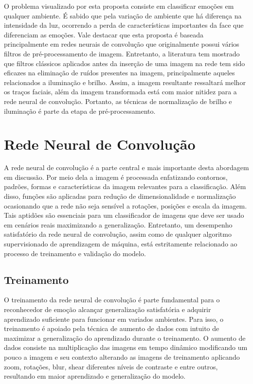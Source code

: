 O problema visualizado por esta proposta consiste em classificar emoções em qualquer ambiente. É sabido que pela variação de ambiente que há diferença na intensidade da luz, ocorrendo a perda de características importantes da face que diferenciam as emoções. Vale destacar que esta proposta é baseada principalmente em redes neurais de convolução que originalmente possui vários filtros de pré-processamento de imagem. Entretanto, a literatura tem mostrado que filtros clássicos aplicados antes da inserção de uma imagem na rede tem sido eficazes na eliminação de ruídos presentes na imagem, principalmente aqueles relacionados a iluminação e brilho. Assim, a imagem resultante ressaltará melhor os traços faciais, além da imagem transformada está com maior nitidez para a rede neural de convolução. Portanto, as técnicas de normalização de brilho e iluminação é parte da etapa de pré-processamento.   


\section{Rede Neural de Convolução}\label{sec:redeneu}
A rede neural de convolução é a parte central e mais importante desta abordagem em discussão. Por meio dela a imagem é processada enfatizando contornos, padrões, formas e características da imagem relevantes para a classificação. Além disso, funções são aplicadas para redução de dimensionalidade e normalização ocasionando que a rede não seja sensível a rotações, posições e escala da imagem. Tais aptidões são essenciais para um classificador de imagens que deve ser usado em cenários reais maximizando a generalização. Entretanto, um desempenho satisfatório da rede neural de convolução, assim como de qualquer algoritmo supervisionado de aprendizagem de máquina, está estritamente relacionado ao processo de treinamento e validação do modelo.    

\subsection{Treinamento}
O treinamento da rede neural de convolução é parte fundamental para o reconhecedor de emoção alcançar generalização satisfatória e adquirir aprendizado suficiente para funcionar em variados ambientes. Para isso, o treinamento é apoiado pela técnica de aumento de dados com intuito de maximizar a generalização do aprendizado durante o treinamento. O aumento de dados consiste na multiplicação das imagens em tempo dinâmico modificando um pouco a imagem e seu contexto alterando as imagens de treinamento aplicando zoom, rotações, blur, shear diferentes níveis de contraste e entre outros, resultando em maior aprendizado e generalização do modelo. 

